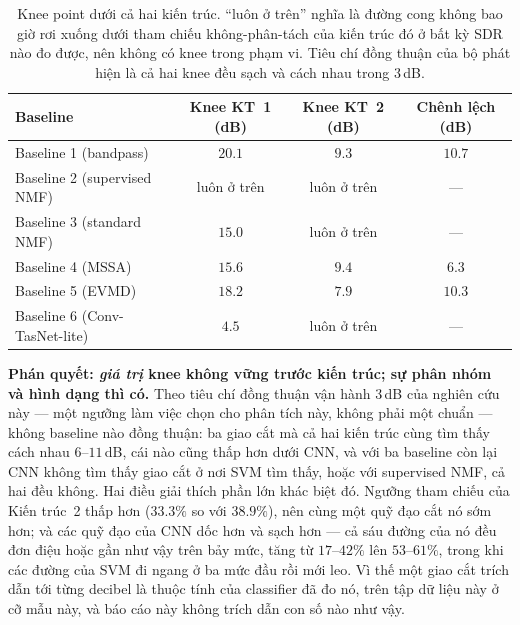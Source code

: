\documentclass[11pt]{article}
\begin{document}
\begin{table}[H]
\centering
\caption{Knee point dưới cả hai kiến trúc. ``luôn ở trên'' nghĩa là đường cong không bao giờ rơi xuống dưới tham chiếu không-phân-tách của kiến trúc đó ở bất kỳ SDR nào đo được, nên không có knee trong phạm vi. Tiêu chí đồng thuận của bộ phát hiện là cả hai knee đều sạch và cách nhau trong $3$\,dB.}
\label{tab:kneecompare}
\begin{tabular}{@{}lccc@{}}
\toprule
Baseline & Knee KT~1 (dB) & Knee KT~2 (dB) & Chênh lệch (dB) \\
\midrule
Baseline 1 (bandpass)         & $20.1$ & $9.3$ & $10.7$ \\
Baseline 2 (supervised NMF)   & luôn ở trên & luôn ở trên & --- \\
Baseline 3 (standard NMF)     & $15.0$ & luôn ở trên & --- \\
Baseline 4 (MSSA)             & $15.6$ & $9.4$ & $6.3$ \\
Baseline 5 (EVMD)             & $18.2$ & $7.9$ & $10.3$ \\
Baseline 6 (Conv-TasNet-lite) & $4.5$  & luôn ở trên & --- \\
\bottomrule
\end{tabular}
\end{table}

\textbf{Phán quyết: \emph{giá trị} knee không vững trước kiến trúc; sự
phân nhóm và hình dạng thì có.} Theo tiêu chí đồng thuận vận hành 3\,dB
của nghiên cứu này --- một ngưỡng làm việc chọn cho phân tích này, không
phải một chuẩn --- không baseline nào đồng thuận: ba giao cắt mà cả hai
kiến trúc cùng tìm thấy cách nhau $6$--$11$\,dB, cái nào cũng thấp hơn
dưới CNN, và với ba baseline còn lại CNN không tìm thấy giao cắt ở nơi
SVM tìm thấy, hoặc với supervised NMF, cả hai đều không. Hai điều giải
thích phần lớn khác biệt đó. Ngưỡng tham chiếu của Kiến trúc~2 thấp hơn
($33.3\%$ so với $38.9\%$), nên cùng một quỹ đạo cắt nó sớm hơn; và các
quỹ đạo của CNN dốc hơn và sạch hơn --- cả sáu đường của nó đều đơn điệu
hoặc gần như vậy trên bảy mức, tăng từ $17$--$42\%$ lên $53$--$61\%$,
trong khi các đường của SVM đi ngang ở ba mức đầu rồi mới leo. Vì thế một
giao cắt trích dẫn tới từng decibel là thuộc tính của classifier đã đo
nó, trên tập dữ liệu này ở cỡ mẫu này, và báo cáo này không trích dẫn
con số nào như vậy.
\end{document}
